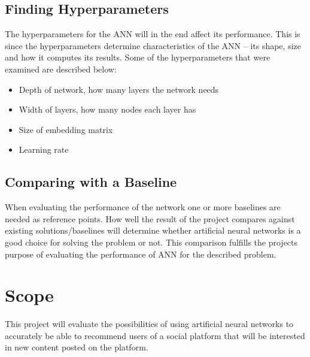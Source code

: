 \subsection{Finding Hyperparameters}
The hyperparameters for the ANN will in the end affect its performance. This is since the hyperparameters determine characteristics of the ANN -- its shape, size and how it computes its results. Some of the hyperparameters that were examined are described below:
\vspace*{0.25cm}
\begin{itemize}
    \item Depth of network, how many layers the network needs
    \item Width of layers, how many nodes each layer has
    \item Size of embedding matrix
    \item Learning rate
\end{itemize}

\subsection{Comparing with a Baseline}
When evaluating the performance of the network one or more baselines are needed as reference points. How well the result of the project compares against existing solutions/baselines will determine whether artificial neural networks is a good choice for solving the problem or not. This comparison fulfills the projects purpose of evaluating the performance of ANN for the described problem.

\section{Scope}
This project will evaluate the possibilities of using artificial neural networks to accurately be able to recommend users of a social platform that will be interested in new content posted on the platform.

